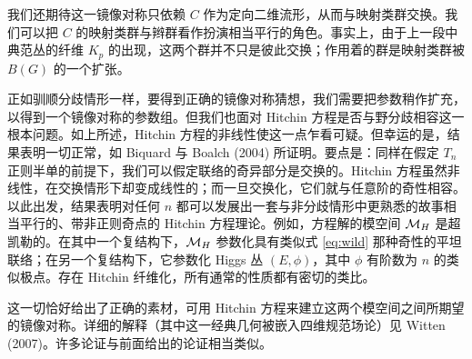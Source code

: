 我们还期待这一镜像对称只依赖 $C$ 作为定向二维流形，从而与映射类群交换。我们可以把 $C$ 的映射类群与辫群看作扮演相当平行的角色。事实上，由于上一段中典范丛的纤维 $K_{p}$ 的出现，这两个群并不只是彼此交换；作用着的群是映射类群被 $B(G)$ 的一个扩张。

正如驯顺分歧情形一样，要得到正确的镜像对称猜想，我们需要把参数稍作扩充，以得到一个镜像对称的参数组。但我们也面对 Hitchin 方程是否与野分歧相容这一根本问题。如上所述，Hitchin 方程的非线性使这一点乍看可疑。但幸运的是，结果表明一切正常，如 Biquard 与 Boalch (2004) 所证明。要点是：同样在假定 $T_{n}$ 正则半单的前提下，我们可以假定联络的奇异部分是交换的。Hitchin 方程虽然非线性，在交换情形下却变成线性的；而一旦交换化，它们就与任意阶的奇性相容。以此出发，结果表明对任何 $n$ 都可以发展出一套与非分歧情形中更熟悉的故事相当平行的、带非正则奇点的 Hitchin 方程理论。例如，方程解的模空间 $\mathcal{M}_{H}$ 是超凯勒的。在其中一个复结构下，$\mathcal{M}_{H}$ 参数化具有类似式 \eqref{eq:wild} 那种奇性的平坦联络；在另一个复结构下，它参数化 Higgs 丛 $(E,\phi)$，其中 $\phi$ 有阶数为 $n$ 的类似极点。存在 Hitchin 纤维化，所有通常的性质都有密切的类比。

这一切恰好给出了正确的素材，可用 Hitchin 方程来建立这两个模空间之间所期望的镜像对称。详细的解释（其中这一经典几何被嵌入四维规范场论）见 Witten (2007)。许多论证与前面给出的论证相当类似。
